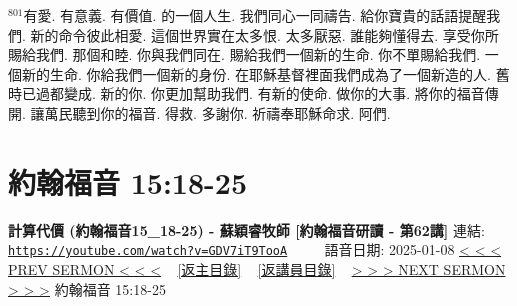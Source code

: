 \documentclass{book}
\begin{document}
$^{801}$有愛.
有意義.
有價值.
的一個人生.
我們同心一同禱告.
給你寶貴的話語提醒我們.
新的命令彼此相愛.
這個世界實在太多恨.
太多厭惡.
誰能夠懂得去.
享受你所賜給我們.
那個和睦.
你與我們同在.
賜給我們一個新的生命.
你不單賜給我們.
一個新的生命.
你給我們一個新的身份.
在耶穌基督裡面我們成為了一個新造的人.
舊時已過都變成.
新的你.
你更加幫助我們.
有新的使命.
做你的大事.
將你的福音傳開.
讓萬民聽到你的福音.
得救.
多謝你.
祈禱奉耶穌命求.
阿們.
\newpage



\section{約翰福音 15:18-25}
\label{sec:GDV7iT9TooA}
\textbf{計算代價 (約翰福音15\_18-25) - 蘇穎睿牧師 [約翰福音研讀 - 第62講]}
\newline
\newline
連結: \href{https://youtube.com/watch?v=GDV7iT9TooA}{\texttt{https://youtube.com/watch?v=GDV7iT9TooA}} ~~~~ 語音日期: 2025-01-08
\newline
\newline
\hyperref[sec:prT7wwZLltI]{< < < PREV SERMON < < <}
~
\hyperlink{toc}{[返主目錄]}
~
\hyperref[ch:preacher10]{[返講員目錄]}
~
\hyperref[sec:pF1FrHKEPww]{> > > NEXT SERMON > > >}
\newline
\newline
約翰福音 15:18-25
\newline
\end{document}
